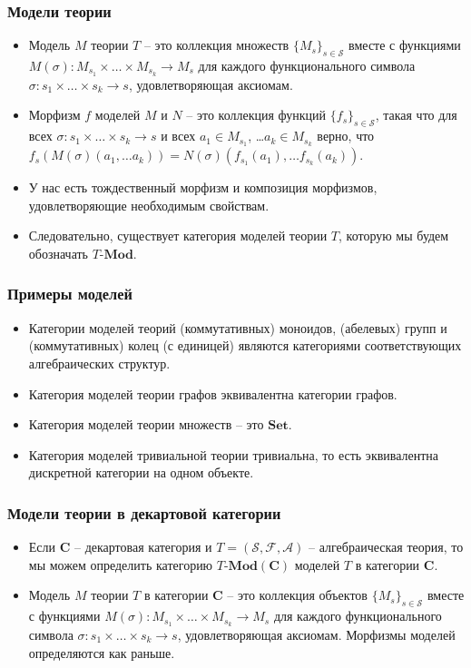 \documentclass{beamer}
\theoremstyle{definition}
\newcommand{\cat}[1]{\mathbf{#1}}
\renewcommand{\C}{\cat{C}}
\newcommand{\Set}{\cat{Set}}
\newcommand{\Mod}[1]{#1\text{-}\cat{Mod}}
\begin{document}
\begin{frame}
\frametitle{Модели теории}
\begin{itemize}
\item Модель $M$ теории $T$ -- это коллекция множеств $\{ M_s \}_{s \in \mathcal{S}}$ вместе с функциями $M(\sigma) : M_{s_1} \times \ldots \times M_{s_k} \to M_s$
для каждого функционального символа $\sigma : s_1 \times \ldots \times s_k \to s$, удовлетворяющая аксиомам.
\item Морфизм $f$ моделей $M$ и $N$ -- это коллекция функций $\{ f_s \}_{s \in \mathcal{S}}$, такая что для всех $\sigma : s_1 \times \ldots \times s_k \to s$ и всех $a_1 \in M_{s_1}$, \ldots $a_k \in M_{s_k}$ верно,
что $f_s(M(\sigma)(a_1, \ldots a_k)) = N(\sigma)(f_{s_1}(a_1), \ldots f_{s_k}(a_k))$.
\item У нас есть тождественный морфизм и композиция морфизмов, удовлетворяющие необходимым свойствам.
\item Следовательно, существует категория моделей теории $T$, которую мы будем обозначать $\Mod{T}$.
\end{itemize}
\end{frame}

\begin{frame}
\frametitle{Примеры моделей}
\begin{itemize}
\item Категории моделей теорий (коммутативных) моноидов, (абелевых) групп и (коммутативных) колец (с единицей) являются категориями соответствующих алгебраических структур.
\item Категория моделей теории графов эквивалентна категории графов.
\item Категория моделей теории множеств -- это $\Set$.
\item Категория моделей тривиальной теории тривиальна, то есть эквивалентна дискретной категории на одном объекте.
\end{itemize}
\end{frame}

\begin{frame}
\frametitle{Модели теории в декартовой категории}
\begin{itemize}
\item Если $\C$ -- декартовая категория и $T = (\mathcal{S},\mathcal{F},\mathcal{A})$ -- алгебраическая теория, то мы можем определить категорию $\Mod{T}(\C)$ моделей $T$ в категории $\C$.
\item Модель $M$ теории $T$ в категории $\C$ -- это коллекция объектов $\{ M_s \}_{s \in \mathcal{S}}$ вместе с функциями $M(\sigma) : M_{s_1} \times \ldots \times M_{s_k} \to M_s$
для каждого функционального символа $\sigma : s_1 \times \ldots \times s_k \to s$, удовлетворяющая аксиомам.
Морфизмы моделей определяются как раньше.
\end{itemize}
\end{frame}
\end{document}
